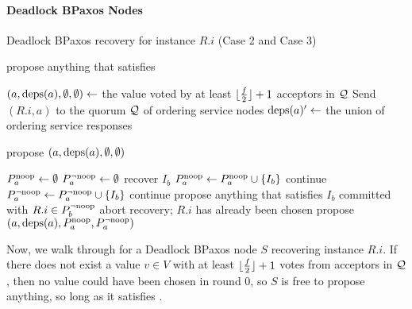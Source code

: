 \paragraph{Deadlock BPaxos Nodes}
\begin{algorithm}[ht]
  \caption{Deadlock BPaxos recovery for instance $R.i$ (Case 2 and Case 3)}%
  \begin{algorithmic}[1]
      \State{} propose anything that satisfies 
    \EndIf{}

    \State{}
    \State{} $(a, \text{deps}(a), \emptyset, \emptyset) \gets$ the value
             voted by at least $\lfloor\frac{f}{2}\rfloor + 1$ acceptors in $\mathcal{Q}$
    \State{} Send $(R.i, a)$ to the quorum $\mathcal{Q}$ of ordering service nodes
    \State{} $\text{deps}(a)' \gets$ the union of ordering service responses

    \State{}
      \State{} propose $(a, \text{deps}(a), \emptyset, \emptyset)$
    \EndIf{}

    \State{}
    \State{} $P^{\text{noop}}_{a} \gets \emptyset$
    \State{} $P^{\lnot \text{noop}}_{a} \gets \emptyset$
        \State{} recover $I_b$
      \EndIf
      \State{} $P^{\text{noop}}_{a} \gets P^{\text{noop}}_{a} \cup \{I_b\}$
        \State{} continue
      \EndIf{}
        \State{} $P^{\lnot \text{noop}}_{a} \gets P^{\lnot \text{noop}}_{a} \cup \{I_b\}$
        \State{} continue
        \State{} propose anything that satisfies 
      \Else{}
        \State{} $I_b$ committed with $R.i \in P^{\lnot \text{noop}}_{b}$
        \State{} abort recovery; $R.i$ has already been chosen
      \EndIf{}
    \EndFor{}
    \State{} propose $(a, \text{deps}(a), P^{\text{noop}}_{a}, P^{\lnot \text{noop}}_{a})$
  \end{algorithmic}
\end{algorithm}

Now, we walk through  for a Deadlock BPaxos node $S$
recovering instance $R.i$. If there does not exist a value $v \in V$ with at
least $\lfloor\frac{f}{2}\rfloor + 1$ votes from acceptors in $\mathcal{Q}$, then no value
could have been chosen in round $0$, so $S$ is free to propose anything, so
long as it satisfies .

